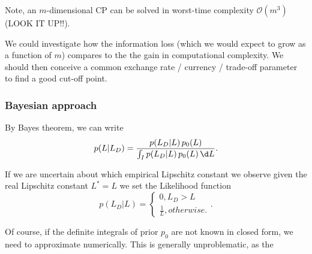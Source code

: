 Note, an $m$-dimensional CP can be solved in worst-time complexity $\mathcal O(m^3)$ (LOOK IT UP!!).


\begin{rem}
We could investigate how the information loss (which we would expect to grow as a function of $m$) compares to the 
the gain in computational complexity. We should then conceive a common exchange rate / currency / trade-off parameter to 
find a good cut-off point.
\end{rem}

\subsubsection{Bayesian approach}

By Bayes theorem, we can write 
\[p(L|L_D) = \frac{p(L_D|L) \, p_0(L) }{ \int_I p(L_D|L) \, p_0(L) \, \d L}.\]

If we are uncertain about which empirical Lipschitz constant we observe given the real Lipschitz constant  $L^* = L$ we set the Likelihood function 
\[ p(L_D|L) = \begin{cases} 0, L_D > L\\ \frac{1}{L}, otherwise. \end{cases}.\]

Of course, if the definite integrals of prior $p_0$ are not known in closed form, we need to approximate numerically. This is generally unproblematic, as the 
